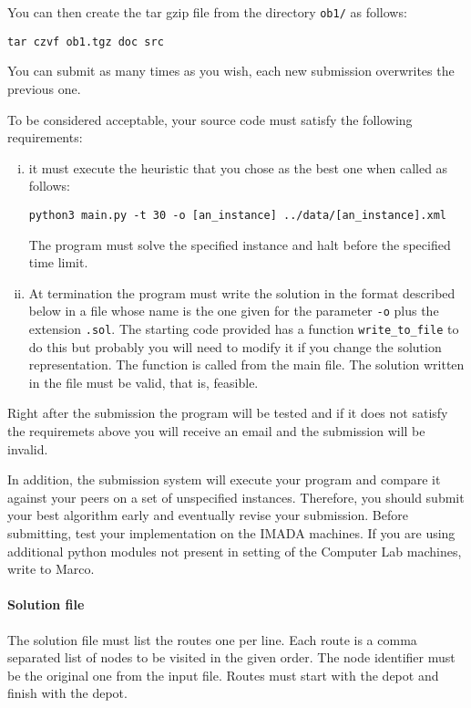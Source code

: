 You can then create the tar gzip file from the directory \verb!ob1/! as
follows:

\begin{lstlisting}
tar czvf ob1.tgz doc src 
\end{lstlisting}


You can submit as many times as you wish, each new submission overwrites
the previous one.


To be considered acceptable, your source code must satisfy the following
requirements:

\begin{enumerate}[i)]
  \item it must execute the heuristic that you chose as the best one
     when called as
    follows:
\begin{lstlisting}
python3 main.py -t 30 -o [an_instance] ../data/[an_instance].xml 
\end{lstlisting}

The program must solve the specified instance and halt before the
specified time limit.

\item At termination the program must write the solution in the format
  described below in a file whose name is the one given for the
  parameter \verb!-o! plus the extension \verb!.sol!. The starting code
  provided has a function \lstinline{write_to_file} to do this but
  probably you will need to modify it if you change the solution
  representation. The function is called from the main file.
  The solution written in the file must be valid, that is, feasible.
\end{enumerate}

  

Right after the submission the program will be tested and if it does not
satisfy the requiremets above you will receive an email and the submission
will be invalid. 

In addition, the submission system will execute your program and compare
it against your peers on a set of unspecified instances. Therefore, you should
submit your best algorithm early and eventually revise your submission.
Before submitting, test your implementation on the IMADA machines.
If you are using additional python modules not present in setting of the
Computer Lab machines, write to Marco.


\paragraph{Solution file} The solution file must list the routes one per
line. Each route is a comma separated list of nodes to be visited in the
given order. The node identifier must be the original one from the input
file.  Routes must start with the depot and finish with the depot.

